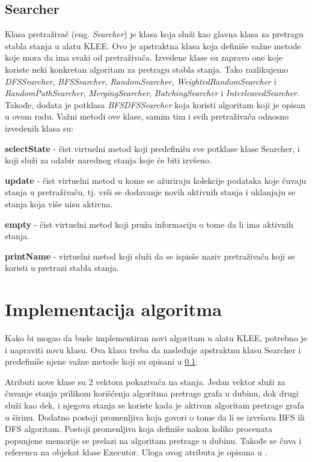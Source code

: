 \documentclass[12pt,oneside]{memoir}
\begin{document}
\subsection{Searcher} \label{pretrazivac}
Klasa pretraživač (eng. \textit{Searcher}) je klasa koja služi kao glavna klasa za pretragu stabla stanja u alatu KLEE. Ovo je apstraktna klasa koja definiše važne metode koje mora da ima svaki od pretraživača. Izvedene klase su zapravo one koje koriste neki konkretan algoritam za pretragu stabla stanja. Tako razlikujemo \textit{DFSSearcher}, \textit{BFSSearcher}, \textit{RandomSearcher}, \textit{WeightedRandomSearcher} i \textit{RandomPathSearcher}, \textit{MergingSearcher}, \textit{BatchingSearcher} i \textit{InterleavedSearcher}. Takođe, dodata je potklasa \textit{BFSDFSSearcher} koja koristi algoritam koji je opisan u ovom radu. Važni metodi ove klase, samim tim i svih pretraživača odnosno izvedenih klasa su:
\begin{description}
    \item \textbf{selectState} - čist virtuelni metod koji predefinišu sve potklase klase Searcher, i koji služi za odabir narednog stanja koje će biti izvšeno.
    
    \item \textbf{update} - čist virtuelni metod u kome se ažuriraju kolekcije podataka koje čuvaju stanja u pretraživaču, tj. vrši se dodavanje novih aktivnih stanja i uklanjaju se stanja koja više nisu aktivna. 
    
    \item \textbf{empty} - čist virtuelni metod koji pruža informaciju o tome da li ima aktivnih stanja.
    
    \item \textbf{printName} - virtuelni metod koji služi da se ispisše naziv pretraživača koji se koristi u pretrazi stabla stanja.
\end{description}

\section{Implementacija algoritma}
Kako bi mogao da bude implementiran novi algoritam u alatu KLEE, potrebno je i napraviti novu klasu. Ova klasa treba da nasleđuje apstraktnu klasu Searcher i predefiniše njene važne metode koji su opisani u \ref{pretrazivac}. 

Atributi nove klase su 2 vektora pokazivača na stanja. Jedan vektor služi za čuvanje stanja prilikom korišćenja algoritma pretrage grafa u dubinu, dok drugi služi kao dek, i njegova stanja se koriste kada je aktivan algoritam pretrage grafa u širinu. Dodatno postoji promenljiva koja govori o tome da li se izvršava BFS ili DFS algoritam. Postoji promenljiva koja definiše nakon koliko procenata popunjene memorije se prelazi na algoritam pretrage u dubinu. Takođe se čuva i referenca na objekat klase Executor. Uloga ovog atributa je opisana u .
\end{document}
